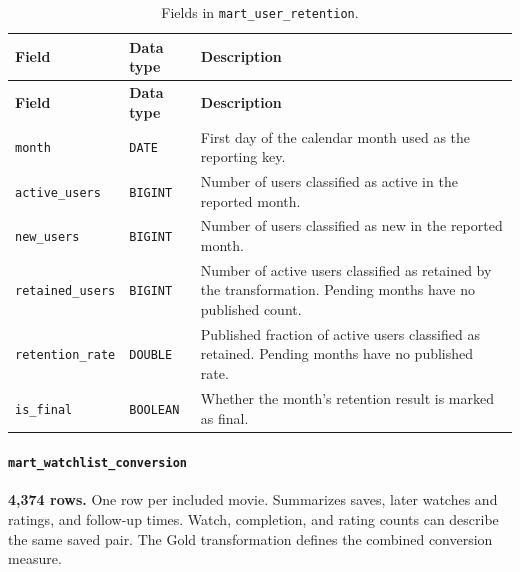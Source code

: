 \documentclass[a4paper,12pt]{article}
\newcommand{\dbsep}{\_\allowbreak}
\begin{document}
\begingroup
\small
\setlength{\tabcolsep}{4pt}
\renewcommand{\arraystretch}{1.1}
\begin{longtable}{@{}>{\raggedright\arraybackslash}p{}
                    >{\raggedright\arraybackslash}p{}
                    >{\raggedright\arraybackslash}p{}@{}}
\caption{Fields in \texttt{mart\dbsep user\dbsep retention}.}\\
\toprule
\textbf{Field} & \textbf{Data type} & \textbf{Description}\\
\midrule
\endfirsthead
\toprule
\textbf{Field} & \textbf{Data type} & \textbf{Description}\\
\midrule
\endhead
\bottomrule
\endfoot
\texttt{month} & \texttt{DATE} & First day of the calendar month used as the reporting key.\\
\texttt{active\dbsep users} & \texttt{BIGINT} & Number of users classified as active in the reported month.\\
\texttt{new\dbsep users} & \texttt{BIGINT} & Number of users classified as new in the reported month.\\
\texttt{retained\dbsep users} & \texttt{BIGINT} & Number of active users classified as retained by the transformation. Pending months have no published count.\\
\texttt{retention\dbsep rate} & \texttt{DOUBLE} & Published fraction of active users classified as retained. Pending months have no published rate.\\
\texttt{is\dbsep final} & \texttt{BOOLEAN} & Whether the month's retention result is marked as final.\\
\end{longtable}
\endgroup

\paragraph{\texttt{mart\dbsep watchlist\dbsep conversion}}
\textbf{4,374 rows.} One row per included movie.
Summarizes saves, later watches and ratings, and follow-up times. Watch, completion, and rating counts can describe the same saved pair. The Gold transformation defines the combined conversion measure.
\end{document}
